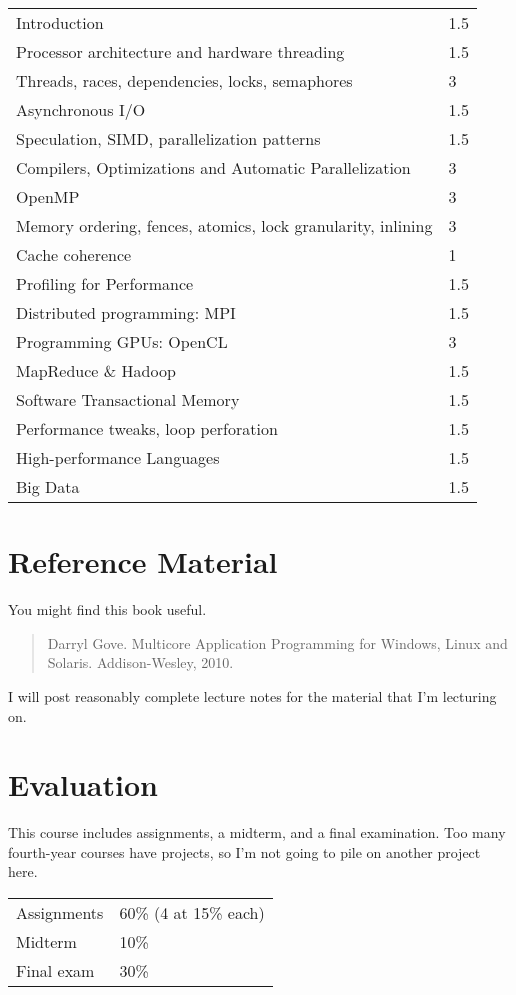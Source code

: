 \documentclass{article}
\begin{document}
\begin{tabular}{ll}
Introduction & 1.5 \\
Processor architecture and hardware threading & 1.5 \\
Threads, races, dependencies, locks, semaphores & 3 \\
Asynchronous I/O & 1.5 \\
Speculation, SIMD, parallelization patterns & 1.5 \\
Compilers, Optimizations and Automatic Parallelization & 3 \\
OpenMP & 3 \\
Memory ordering, fences, atomics, lock granularity, inlining & 3 \\
Cache coherence & 1 \\
Profiling for Performance & 1.5 \\
Distributed programming: MPI & 1.5\\
Programming GPUs: OpenCL & 3 \\
MapReduce \& Hadoop & 1.5 \\
Software Transactional Memory & 1.5 \\
Performance tweaks, loop perforation & 1.5 \\
High-performance Languages & 1.5 \\
Big Data & 1.5 
\end{tabular}

\section*{Reference Material}
You might find this book useful.

\begin{quote}
    Darryl Gove. Multicore Application Programming for Windows, Linux and Solaris. Addison-Wesley, 2010.
\end{quote}

\noindent
I will post reasonably complete lecture notes for the material
that I'm lecturing on.

\newpage
\section*{Evaluation}
This course includes assignments, a midterm, and a final
examination. Too many fourth-year courses have projects, so I'm not
going to pile on another project here.\vspace*{1em}

\begin{tabular}{l@{\hspace*{5em}}l}
Assignments & 60\% (4 at 15\% each) \\
Midterm & 10\% \\
Final exam & 30\% \\
\end{tabular}
\end{document}
